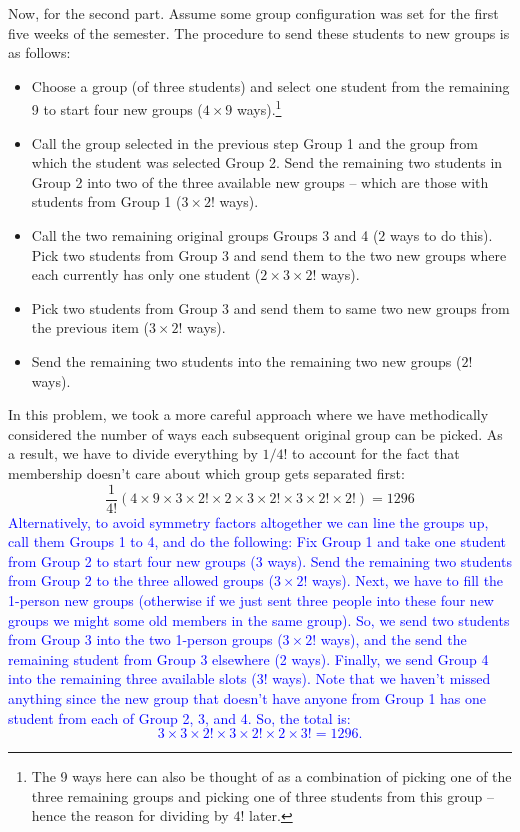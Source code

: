 \documentclass[11pt]{article}
\newcommand{\f}[2]{\frac{#1}{#2}}
\begin{document}
\begin{enumerate}[(a)]
		
	Now, for the second part. Assume some group configuration was set for the first five weeks of the semester. The procedure to send these students to new groups is as follows:
	\begin{itemize}
		\item Choose a group (of three students) and select one student from the remaining 9 to start four new groups ($4\times9$ ways).\footnote{The 9 ways here can also be thought of as a combination of picking one of the three remaining groups and picking one of three students from this group -- hence the reason for dividing by $4!$ later.}
		\item Call the group selected in the previous step Group 1 and the group from which the student was selected Group 2. Send the remaining two students in Group 2 into two of the three available new groups --  which are those with students from Group 1 ($3\times 2!$ ways). 
		\item Call the two remaining original groups Groups 3 and 4 ($2$ ways to do this). Pick two students from Group 3 and send them to the two new groups where each currently has only one student ($2\times 3\times 2!$ ways).		
		\item Pick two students from Group 3 and send them to same two new groups from the previous item ($3\times 2!$ ways).
		\item Send the remaining two students into the remaining two new groups ($2!$ ways).
	\end{itemize}
	In this problem, we took a more careful approach where we have methodically considered the number of ways each subsequent original group can be picked. As a result, we have to divide everything by $1/4!$ to account for the fact that membership doesn't care about which group gets separated first: 
	\begin{equation*}
	\f{1}{4!}\left( 4\times 9\times 3\times 2! \times 2\times  3\times 2! \times 3\times 2!\times 2! \right) = \boxed{1296}
	\end{equation*}
	\textcolor{blue}{Alternatively, to avoid symmetry factors altogether we can line the groups up, call them Groups 1 to 4, and do the following: Fix Group 1 and take one student from Group 2 to start four new groups (3 ways). Send the remaining two students from Group $2$ to the three allowed groups ($3\times 2!$ ways). Next, we have to fill the 1-person new groups (otherwise if we just sent three people into these four new groups we might some old members in the same group). So, we send two students from Group 3 into the two 1-person groups ($3\times 2!$ ways), and the send the remaining student from Group 3 elsewhere (2 ways). Finally, we send Group 4 into the remaining three available slots (3! ways). Note that we haven't missed anything since the new group that doesn't have anyone from Group 1 has one student from each of Group 2, 3, and 4. So, the total is: 
	\begin{equation*}
	3\times 3\times 2! \times 3\times 2! \times 2 \times 3! = 1296.
	\end{equation*} }
\end{enumerate} 
\end{document}
